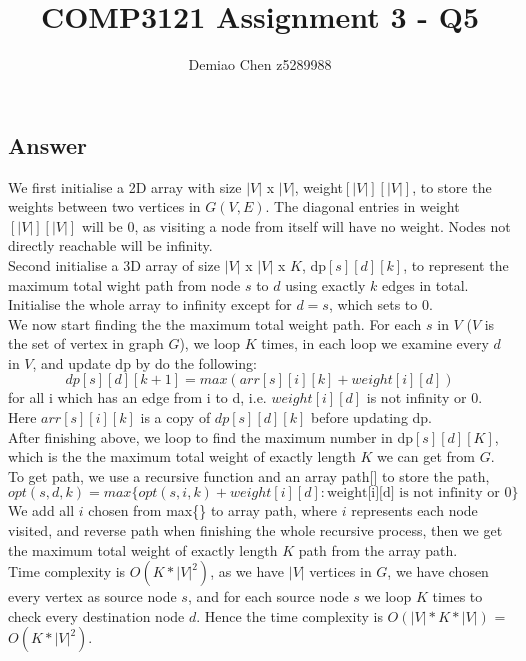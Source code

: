 \documentclass[12pt]{article}
\title{COMP3121 Assignment 3 - Q5}
\author{Demiao Chen z5289988}
\begin{document}
\maketitle
{}


\subsection*{Answer}
We first initialise a 2D array with size $|V|$ x $|V|$, weight$[|V|][|V|]$, to store 
the weights between two vertices in $G(V, E)$. The diagonal entries in weight$[|V|][|V|]$ will be 0, as visiting 
a node from itself will have no weight. Nodes not directly reachable will be infinity.\\
Second initialise a 3D array of size $|V|$ x $|V|$ x $K$, dp$[s][d][k]$, to represent the maximum total wight path from
node $s$ to $d$ using exactly $k$ edges in total. Initialise the whole array to infinity except for $d = s$, which sets to 0.\\
We now start finding the the maximum total weight path.
For each $s$ in $V$ ($V$ is the set of vertex in graph $G$), we loop $K$ times, in each loop we 
examine every $d$ in $V$, and update dp by do the following:
\[
    dp[s][d][k+1] = max(arr[s][i][k]+weight[i][d])
\]
for all i which has an edge from i to d, i.e. $weight[i][d]$ is not infinity or 0. \\
Here $arr[s][i][k]$ is a copy of $dp[s][d][k]$ before updating dp.\\
After finishing above, we loop to find the maximum number in dp$[s][d][K]$, which is the 
the maximum total weight of exactly length $K$ we can get from $G$. \\
To get path, we use a recursive function and an array path[] to store the path, $$
    opt(s, d, k) = max\{opt(s, i, k)+weight[i][d]: \mbox{weight[i][d] is not infinity or 0}\}
$$
We add all $i$ chosen from max\{\} to array path, where $i$ represents each node visited, and reverse path when finishing the whole recursive process, then
we get the maximum total weight of exactly length $K$ path from the array path.\\
Time complexity is $O(K*|V|^2)$, as we have $|V|$ vertices in $G$, we have chosen every vertex as 
source node $s$, and for each source node $s$ we loop $K$ times to check every destination node $d$. Hence
the time complexity is $O(|V|* K *|V|)$ = $O(K*|V|^2)$.
\end{document}
